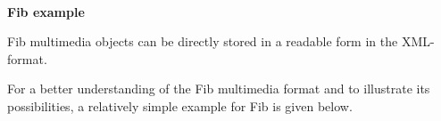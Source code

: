 \documentclass[12pt,a4paper]{article}
\begin{document}
\renewcommand{\sectionmark}[1]{\markboth{#1}{}}
\pagestyle{scrheadings} %
\ihead{} %
\ohead{} %




\ \vspace{-2.5cm}
\begin{center}
   \LARGE\bf Fib example\\
\end{center}

\noindent
Fib multimedia objects can be directly stored in a readable form in the XML-format.

For a better understanding of the Fib multimedia format and to illustrate its possibilities, a relatively simple example for Fib is given below.
\end{document}
